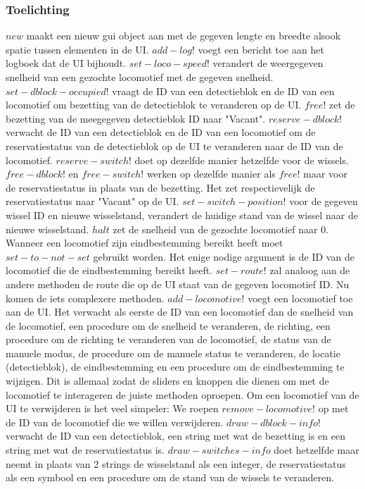 \documentclass{article}
\begin{document}
\subsubsection{Toelichting}
$new$ maakt een nieuw gui object aan met de gegeven lengte en breedte alsook spatie tussen elementen in de UI. $add-log!$ voegt een bericht toe aan het logboek dat 
de UI bijhoudt. $set-loco-speed!$ verandert de weergegeven snelheid van een gezochte locomotief met de gegeven snelheid. 
$set-dblock-occupied!$ vraagt de ID van een detectieblok en de ID van een locomotief om bezetting van de detectieblok te veranderen op de UI.
$free!$ zet de bezetting van de meegegeven detectieblok ID naar "Vacant". $reserve-dblock!$ verwacht de ID van een detectieblok en de ID van een locomotief om 
de reservatiestatus van de detectieblok op de UI te veranderen naar de ID van de locomotief. $reserve-switch!$ doet op dezelfde manier hetzelfde voor de wissels. $free-dblock!$ en $free-switch!$ werken op dezelfde
manier als $free!$ maar voor de reservatiestatus in plaats van de bezetting. Het zet respectievelijk de reservatiestatus naar "Vacant" op de UI.
$set-switch-position!$ voor de gegeven wissel ID en nieuwe wisselstand, verandert de huidige stand van de wissel naar de nieuwe wisselstand. 
$halt$ zet de snelheid van de gezochte locomotief naar 0. Wanneer een locomotief zijn eindbestemming bereikt heeft moet $set-to-not-set$ gebruikt worden. Het enige 
nodige argument is de ID van de locomotief die de eindbestemming bereikt heeft. 
$set-route!$ zal analoog aan de andere methoden de route die op de UI staat van de gegeven locomotief ID. Nu komen de iets
complexere methoden. $add-locomotive!$ voegt een locomotief toe aan de UI. Het verwacht als eerste
de ID van een locomotief dan de snelheid van de locomotief, een procedure om de snelheid te veranderen, de richting, 
een procedure om de richting te veranderen van de locomotief, de status van de manuele modus, de procedure om de manuele status te veranderen, de locatie (detectieblok), de eindbestemming en een procedure om de eindbestemming te wijzigen. 
Dit is allemaal zodat de sliders en knoppen die dienen om met de locomotief te interageren de juiste methoden oproepen. 
Om een locomotief van de UI te verwijderen is het veel simpeler: We roepen $remove-locomotive!$ op met de ID van de locomotief
die we willen verwijderen. $draw-dblock-info!$ verwacht de ID van een detectieblok, een string met wat de bezetting is en een string met wat de reservatiestatus is. 
$draw-switches-info$ doet hetzelfde maar neemt in plaats van 2 strings de wisselstand als een integer, de reservatiestatus als een symbool en een procedure om de stand van de wissels te veranderen.
\end{document}
